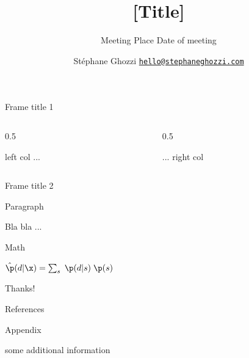 \documentclass[8pt,aspectratio=169]{beamer}
\title{[Title]}
\subtitle{
    \vspace{1em}
    \small 
    Meeting \newline 
    Place \newline 
    Date of meeting
    \normalsize
}
\author{
    \newline \newline 
    Stéphane Ghozzi \newline 
    \small 
    \href{mailto:hello@stephaneghozzi.com}{\nolinkurl{hello@stephaneghozzi.com}} 
    \normalsize
}
\date{}
\begin{document}

\begin{frame}{Frame title 1}
\protect\hypertarget{section-6}{}
  \begin{columns}
    \begin{column}{0.5\textwidth}
      
      left col ...

    \end{column}
    \begin{column}{0.5\textwidth}
      
        \pause
      
        ... right col
      
    \end{column}
  \end{columns}
\end{frame}

\begin{frame}{Frame title 2}

  \textcolor{mplblue}{Paragraph} 

  \vspace{1em}

  Bla bla ... \cite{Abbood2020}

  \vspace{3em}

  \pause

  \textcolor{mplblue}{Math}

  \vspace{1em}

  $\hat\p(d|\x) = \sum_s\; \p(d|s)\; \p(s)$

  \vfill

  \tiny
  \hfill \cite{Abbood2020,Yousefinaghani2019,Kogan2021}
  \normalsize

\end{frame}

\begin{frame}
  \begin{center}
    Thanks!
  \end{center}
\end{frame}

\begin{frame}{References} 
  \tiny
  
  
  \normalsize
\end{frame}

\begin{frame}
  \begin{center}
    \large
    \textcolor{mplblue}{Appendix}
    \normalsize
  \end{center}
\end{frame}

\begin{frame}
  some additional information
\end{frame}
\end{document}

